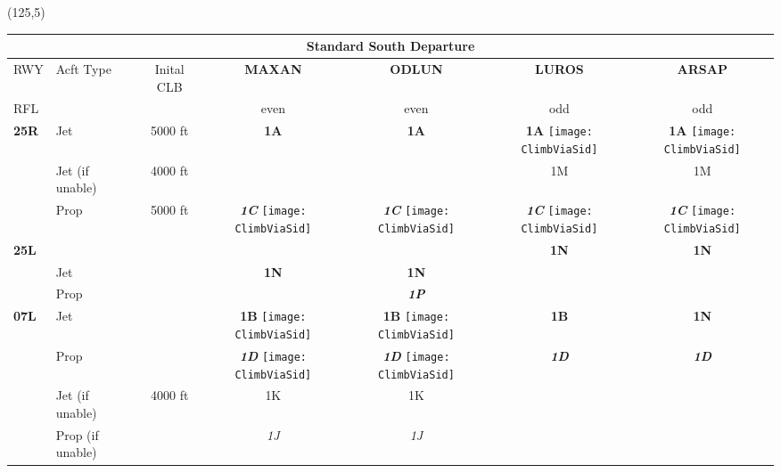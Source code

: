 \documentclass[10pt,landscape,a4paper]{article}
\begin{document}
\begin{textblock}{30}(125,5)
\begin{table}[]
\begin{tabular}{|l|l|c|c|c|c|c|}
\multicolumn{7}{c}{\textbf{Standard South Departure}}  \\ \hline
RWY 			& Acft Type				& Inital CLB & \textbf{MAXAN} & \textbf{ODLUN} & \textbf{LUROS} & \textbf{ARSAP} \\ 
RFL 			& 						& 		& even & even & odd & odd\\			\hline

\textbf{25R} & Jet & 5000 ft & \textbf{1A} & \textbf{1A} & \textbf{1A} \texttt{[image: ClimbViaSid]} & \textbf{1A} \texttt{[image: ClimbViaSid]} \\ \cline{2-7}
& Jet (if unable) & 4000 ft & & & 1M & 1M \\ \cline{2-7}
& Prop & \multirow{6}{*}{5000 ft} & \textbf{\textit{1C}} \texttt{[image: ClimbViaSid]} & \textbf{\textit{1C}} \texttt{[image: ClimbViaSid]} & \textbf{\textit{1C}}  \texttt{[image: ClimbViaSid]} & \textbf{\textit{1C}} \texttt{[image: ClimbViaSid]} \\ \cline{1-2} \cline{4-7}

\textbf{25L} & & & & & \textbf{1N} & \textbf{1N} \\ \cline{2-2} \cline{4-7}
& Jet & & \textbf{1N} & \textbf{1N} & & \\ \cline{2-2} \cline{4-7}
& Prop & & & \textbf{\textit{1P}} & & \\ \cline{1-2} \cline{4-7}

\textbf{07L} & Jet &  & \textbf{1B} \texttt{[image: ClimbViaSid]} & \textbf{1B} \texttt{[image: ClimbViaSid]} & \textbf{1B} & \textbf{1N} \\ \cline{2-2} \cline{4-7}& Prop & & \textbf{\textit{1D}} \texttt{[image: ClimbViaSid]} & \textbf{\textit{1D}} \texttt{[image: ClimbViaSid]} & \textbf{\textit{1D}} & \textbf{\textit{1D}} \\ \cline{2-7}
& Jet (if unable) & \multirow{2}{*}{4000 ft} & 1K & 1K & & \\ \cline{2-2} \cline{4-7}
& Prop (if unable) & & \textit{1J} & \textit{1J} & &  \\ \hline


\end{tabular}
\end{table}
\end{textblock}
\end{document}
